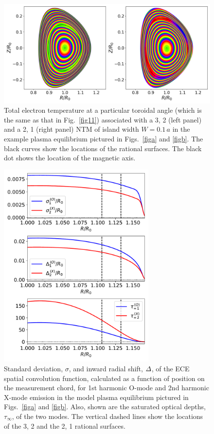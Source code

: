 \documentclass{iopjournal}
\begin{document}
{\begin{figure}
\centerline{\includegraphics[width=\textwidth]{Fig14.png}}
\caption{Total electron temperature  at a particular toroidal angle (which is the same as that in Fig.~\ref{fig11}) associated with a 3, 2 (left panel) and a 2, 1 (right panel) NTM of island width $W=0.1\,a$  in the example plasma equilibrium pictured in Figs.~\ref{figa}
and \ref{figb}. The black curves show the locations of the rational surfaces. The black dot shows the location of the magnetic axis.\label{fig12}}
\end{figure}

\begin{figure}
\centerline{\includegraphics[width=0.7\textwidth]{Fig15.pdf}}
\caption{Standard deviation, $\sigma$, and inward radial shift, ${\mit\Delta}$, of the ECE spatial convolution function,  calculated as
a function of position on the measurement chord, for 1st harmonic O-mode and 2nd harmonic X-mode emission  in the model plasma equilibrium pictured in Figs.~\ref{figa} and \ref{figb}. Also, shown are the
saturated optical depths, $\tau_\infty$, of the two modes. The vertical dashed lines show the locations of the 3, 2 and the 2, 1 rational surfaces.}\label{fece}
\end{figure}

}
\end{document}
